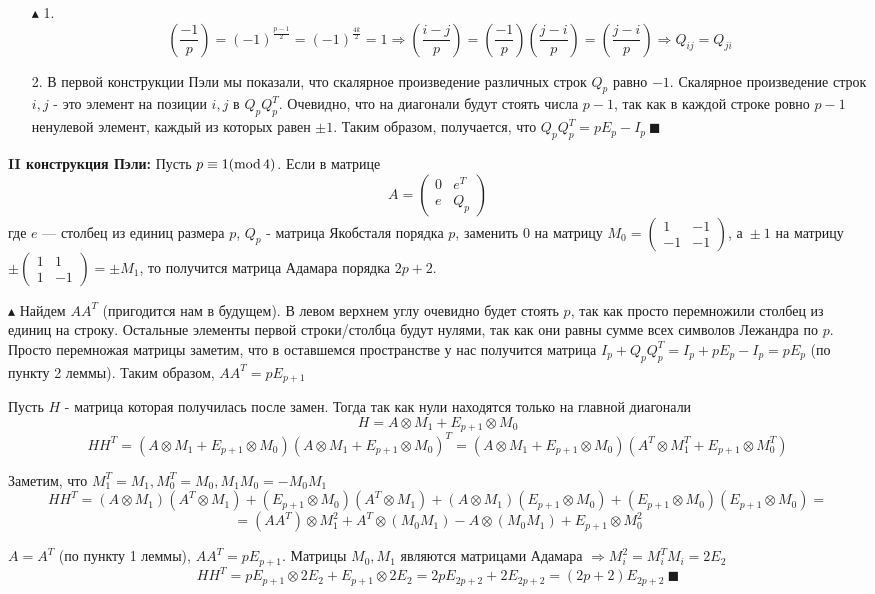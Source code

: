 \par \begin{itemize}
    \item[$\blacktriangle$ 1.] $$\left(\frac{-1}{p}\right)=(-1)^\frac{p-1}{2}=(-1)^\frac{4k}{2}=1 \Rightarrow \left(\frac{i-j}{p}\right)=\left(\frac{-1}{p}\right) \left(\frac{j-i}{p}\right)= \left(\frac{j-i}{p}\right) \Rightarrow Q_{ij}=Q_{ji}$$ 
    \item[2.] В первой конструкции Пэли мы показали, что скалярное произведение различных строк $Q_p$ равно $-1$. Скалярное произведение строк $i, j$ - это элемент на позиции $i,j$ в $Q_pQ_p^T$. Очевидно, что на диагонали будут стоять числа $p-1$, так как в каждой строке ровно $p-1$ ненулевой элемент, каждый из которых равен $\pm 1$. Таким образом, получается, что $Q_pQ_p^T=pE_p-I_p \: \blacksquare$
\end{itemize}
\par \textbf{II конструкция Пэли:} Пусть $p \equiv 1 (\operatorname{mod} 4)$. Если в матрице
$$A=\left(
\begin{array}{cc}
0 & e^T\\
e &  Q_p
\end{array}
\right)$$
где $e$ — столбец из единиц размера $p$, $Q_p$ - матрица Якобсталя порядка $p$, заменить $0$ на матрицу 
$M_0=\left(
\begin{array}{cc}
1 & -1\\
-1 &  -1
\end{array}
\right)$, а$\; \pm 1$ на матрицу $\pm \left(
\begin{array}{cc}
1 & 1\\
1 & -1
\end{array}
\right)=\pm M_1$, то
получится матрица Адамара порядка $2p + 2$.
\par $\blacktriangle$ Найдем $AA^T$ (пригодится нам в будущем). В левом верхнем углу очевидно будет стоять $p$, так как просто перемножили столбец из единиц на строку. Остальные элементы первой строки/столбца будут нулями, так как они равны сумме всех символов Лежандра по $p$. Просто перемножая матрицы заметим, что в оставшемся пространстве у нас получится матрица $I_p+Q_pQ_p^T=I_p+pE_p-I_p=pE_p$ (по пункту 2 леммы). Таким образом, $AA^T=pE_{p+1}$
\par Пусть $H$ - матрица которая получилась после замен. Тогда так как нули находятся только на главной диагонали $$H=A \otimes M_1+E_{p+1} \otimes M_0$$
$$HH^T=(A \otimes M_1 + E_{p+1} \otimes M_0)(A \otimes M_1 + E_{p+1} \otimes M_0)^T=(A \otimes M_1 + E_{p+1} \otimes M_0)(A^T \otimes M_1^T + E_{p+1} \otimes M_0^T)$$
\par Заметим, что $M_1^T=M_1, M_0^T=M_0, M_1M_0=-M_0M_1$
$$HH^T=(A \otimes M_1)(A^T \otimes M_1)+(E_{p+1} \otimes M_0)(A^T \otimes M_1) + (A \otimes M_1)(E_{p+1} \otimes M_0) + (E_{p+1} \otimes M_0)(E_{p+1} \otimes M_0)=$$
$$=(AA^T)\otimes M_1^2 + A^T \otimes (M_0M_1) - A \otimes (M_0M_1) + E_{p+1} \otimes M_0^2$$
\par $A=A^T$ (по пункту 1 леммы), $AA^T=pE_{p+1}$. Матрицы $M_0, M_1$ являются матрицами Адамара $\Rightarrow M_i^2=M_i^TM_i=2E_2$
$$HH^T= pE_{p+1} \otimes 2E_2 + E_{p+1} \otimes 2E_2=2pE_{2p+2} + 2E_{2p+2}=(2p+2)E_{2p+2} \: \blacksquare$$